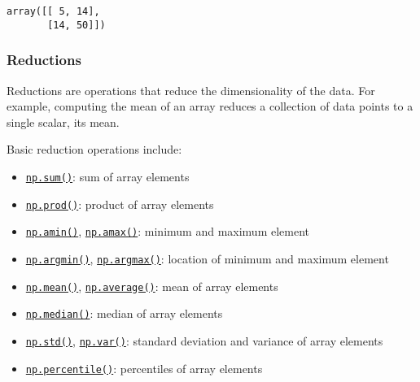 \documentclass{scrartcl}
\makeatletter
\providecommand{\tightlist}{%
      \setlength{\itemsep}{0pt}\setlength{\parskip}{0pt}}
\newcommand{\boxspacing}{\kern\kvtcb@left@rule\kern\kvtcb@boxsep}
\newcommand{\prompt}[4]{
        {\ttfamily\llap{{\color{#2}[#3]:\hspace{3pt}#4}}\vspace{-\baselineskip}}
    }
\makeatother
\begin{document}
            \begin{tcolorbox}[breakable, size=fbox, boxrule=.5pt, pad at break*=1mm, opacityfill=0]
\prompt{Out}{outcolor}{39}{\boxspacing}
\begin{Verbatim}[commandchars=\\\{\}]
array([[ 5, 14],
       [14, 50]])
\end{Verbatim}
\end{tcolorbox}
        
    \hypertarget{reductions}{%
\subsubsection{Reductions}\label{reductions}}

Reductions are operations that reduce the dimensionality of the data.
For example, computing the mean of an array reduces a collection of data
points to a single scalar, its mean.

Basic reduction operations include:

\begin{itemize}
\tightlist
\item
  \href{https://numpy.org/doc/stable/reference/generated/numpy.sum.html}{\texttt{np.sum()}}:
  sum of array elements
\item
  \href{https://numpy.org/doc/stable/reference/generated/numpy.prod.html}{\texttt{np.prod()}}:
  product of array elements
\item
  \href{https://numpy.org/doc/stable/reference/generated/numpy.amin.html}{\texttt{np.amin()}},
  \href{https://numpy.org/doc/stable/reference/generated/numpy.amax.html}{\texttt{np.amax()}}:
  minimum and maximum element
\item
  \href{https://numpy.org/doc/stable/reference/generated/numpy.argmin.html}{\texttt{np.argmin()}},
  \href{https://numpy.org/doc/stable/reference/generated/numpy.argmax.html}{\texttt{np.argmax()}}:
  location of minimum and maximum element
\item
  \href{https://numpy.org/doc/stable/reference/generated/numpy.mean.html}{\texttt{np.mean()}},
  \href{https://numpy.org/doc/stable/reference/generated/numpy.average.html}{\texttt{np.average()}}:
  mean of array elements
\item
  \href{https://numpy.org/doc/stable/reference/generated/numpy.median.html}{\texttt{np.median()}}:
  median of array elements
\item
  \href{https://numpy.org/doc/stable/reference/generated/numpy.std.html}{\texttt{np.std()}},
  \href{https://numpy.org/doc/stable/reference/generated/numpy.var.html}{\texttt{np.var()}}:
  standard deviation and variance of array elements
\item
  \href{https://numpy.org/doc/stable/reference/generated/numpy.percentile.html}{\texttt{np.percentile()}}:
  percentiles of array elements
\end{itemize}
\end{document}
